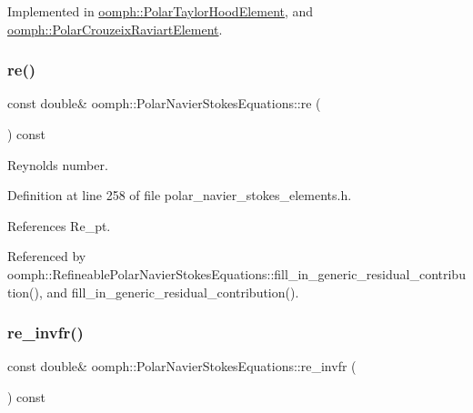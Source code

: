 Implemented in \hyperlink{classoomph_1_1PolarTaylorHoodElement_ad382221466572628efe24ae3c0be7291}{oomph\+::\+Polar\+Taylor\+Hood\+Element}, and \hyperlink{classoomph_1_1PolarCrouzeixRaviartElement_a919b450ac1bb494ca96b94b717a9a37b}{oomph\+::\+Polar\+Crouzeix\+Raviart\+Element}.

\mbox{\label{classoomph_1_1PolarNavierStokesEquations_ac0de4c87dc0440dad909f044a5a99080}} 
\subsubsection{\texorpdfstring{re()}{re()}}
{\footnotesize\ttfamily const double\& oomph\+::\+Polar\+Navier\+Stokes\+Equations\+::re (\begin{DoxyParamCaption}{ }\end{DoxyParamCaption}) const\hspace{0.3cm}{\ttfamily [inline]}}



Reynolds number. 



Definition at line 258 of file polar\+\_\+navier\+\_\+stokes\+\_\+elements.\+h.



References Re\+\_\+pt.



Referenced by oomph\+::\+Refineable\+Polar\+Navier\+Stokes\+Equations\+::fill\+\_\+in\+\_\+generic\+\_\+residual\+\_\+contribution(), and fill\+\_\+in\+\_\+generic\+\_\+residual\+\_\+contribution().

\mbox{\label{classoomph_1_1PolarNavierStokesEquations_a4786ce3f5ede7e3a0ad523b5aaa19ee2}} 
\subsubsection{\texorpdfstring{re\+\_\+invfr()}{re\_invfr()}}
{\footnotesize\ttfamily const double\& oomph\+::\+Polar\+Navier\+Stokes\+Equations\+::re\+\_\+invfr (\begin{DoxyParamCaption}{ }\end{DoxyParamCaption}) const\hspace{0.3cm}{\ttfamily [inline]}}



